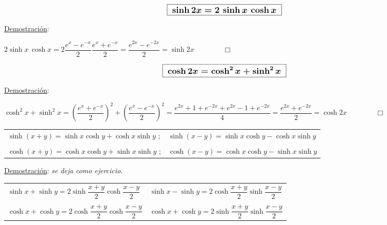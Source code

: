 \vspace{5mm}
\begin{theorem}

$$\large{ \boxed{ \ \boldsymbol{ \sinh 2x=2\, \sinh x \, \cosh x } \ } }	$$
\end{theorem}

\normalsize{\underline{Demostración}:} 

$2\sinh x \, \cosh x=2 \dfrac{e^x-e^{-x}}{2} \dfrac{e^x+e^{-x}}{2} =\dfrac{e^{2x}-e^{-2x}}{2} =\sinh 2x\qquad \qquad \Box$

\vspace{5mm}
\begin{theorem}

$$\large{ \boxed{ \ \boldsymbol{ \cosh 2x= \cosh^2 x + \sinh^2 x } \ } }	$$
\end{theorem}

\normalsize{\underline{Demostración}:} 

$\cosh^2 x+\sinh^2 x=\left( \dfrac{e^x+e^{-x}}{2} \right)^2 +\left( \dfrac{e^x-e^{-x}}{2} \right)^2 = \dfrac{e^{2x}+1+e^{-2x}+e^{2x}-1+e^{-2x}}{4}=  \dfrac{e^{2x}+e^{-2x}}{2} =\cosh 2x\qquad \qquad \Box$

\vspace{5mm}
\begin{theorem}

\begin{table}[H]
\centering
\begin{tabular}{ll}
$\sinh(x+y)=\sinh x \cosh y+ \cosh x\sinh y$ ;      & $\sinh(x-y)=\sinh x \cosh y- \cosh x\sinh y$   \\ \\
$\cosh (x+y)=\cosh x \cosh y + \sinh x \sinh y$ ;    & $\cosh (x-y)=\cosh x \cosh y - \sinh x \sinh y$
\end{tabular}
\end{table}
\end{theorem}

\normalsize{\underline{Demostración}:} \emph{se deja como ejercicio}.


\vspace{5mm}
\begin{theorem}

\begin{table}[H]
\centering
\begin{tabular}{ll}
$ \sinh x + \sinh y = 2 \sinh \dfrac{x+y}2 \cosh \dfrac{x-y}2$   &   $ \sinh x - \sinh y = 2 \cosh \dfrac{x+y}2 \sinh \dfrac{x-y}2$ \\ \\
$ \cosh x + \cosh y = 2 \cosh \dfrac{x+y}2 \cosh \dfrac{x-y}2$    & $ \cosh x + \cosh y = 2 \sinh \dfrac{x+y}2 \sinh \dfrac{x-y}2$
\end{tabular}
\end{table}
\end{theorem}


